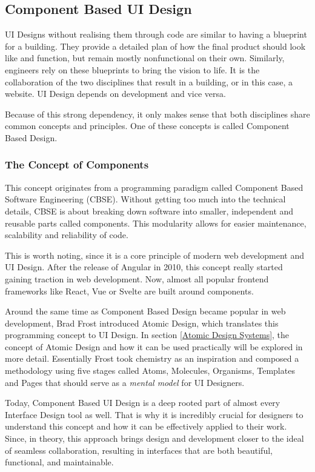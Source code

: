 \newpage
\subsection{Component Based UI Design}
UI Designs without realising them through code are similar to having a blueprint for a building.
They provide a detailed plan of how the final product should look like and function, but remain
mostly nonfunctional on their own. Similarly, engineers rely on these blueprints to bring the vision
to life. It is the collaboration of the two disciplines that result in a building, or in this case,
a website. UI Design depends on development and vice versa. 

Because of this strong dependency, it only makes sense that both disciplines share common concepts
and principles. One of these concepts is called Component Based Design.

\subsubsection{The Concept of Components}
This concept originates from a programming paradigm called Component Based Software Engineering
(CBSE). Without getting too much into the technical details, CBSE is about breaking down software
into smaller, independent and reusable parts called components. This modularity allows for easier
maintenance, scalability and reliability of code.

This is worth noting, since it is a core principle of modern web development and UI Design.
After the release of Angular in 2010, this concept really started gaining traction in web
development. 
Now, almost all popular frontend frameworks like React, Vue or Svelte are built around components.
  

Around the same time as Component Based Design became popular in web development, Brad Frost
introduced Atomic Design, which translates this programming concept to UI Design. In section
\ref{Atomic Design Systems}, the concept of Atomic Design and how it can be used practically will be
explored in more detail. Essentially Frost took chemistry as an inspiration and composed a methodology
using five stages called Atoms, Molecules, Organisms, Templates and Pages that should serve as a
\textit{mental model} for UI Designers. 

Today, Component Based UI Design is a deep rooted part of almost every Interface Design tool as
well. That is why it is incredibly crucial for designers to understand this concept and how it can
be effectively applied to their work. Since, in theory, this approach brings design and development
closer to the ideal of seamless collaboration, resulting in interfaces that are both beautiful,
functional, and maintainable.